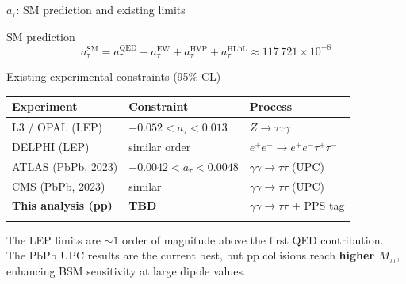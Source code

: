 \begin{frame}{\(a_\tau\): SM prediction and existing limits}
\protect{}\label{a_tau-sm-prediction-and-existing-limits}
\begin{block}{SM prediction}
\protect{}\label{sm-prediction}
\[a_\tau^\text{SM} = a_\tau^\text{QED} + a_\tau^\text{EW} + a_\tau^\text{HVP} + a_\tau^\text{HLbL} \approx 117\,721 \times 10^{-8}\]
\end{block}

\begin{block}{Existing experimental constraints (95\% CL)}
\protect{}\label{existing-experimental-constraints-95-cl}
{\def\LTcaptype{none} %
\begin{longtable}[]{@{}
  >{\raggedright\arraybackslash}p{}
  >{\raggedright\arraybackslash}p{}
  >{\raggedright\arraybackslash}p{}@{}}
\toprule\noalign{}
\begin{minipage}[b]{\linewidth}\raggedright
Experiment
\end{minipage} & \begin{minipage}[b]{\linewidth}\raggedright
Constraint
\end{minipage} & \begin{minipage}[b]{\linewidth}\raggedright
Process
\end{minipage} \\
\midrule\noalign{}
\endhead
L3 / OPAL (LEP) & \(-0.052 < a_\tau < 0.013\) &
\(Z \to \tau\tau\gamma\) \\
DELPHI (LEP) & similar order & \(e^+e^- \to e^+e^-\tau^+\tau^-\) \\
ATLAS (PbPb, 2023) & \(-0.0042 < a_\tau < 0.0048\) &
\(\gamma\gamma \to \tau\tau\) (UPC) \\
CMS (PbPb, 2023) & similar & \(\gamma\gamma \to \tau\tau\) (UPC) \\
\textbf{This analysis (pp)} & \textbf{TBD} &
\(\gamma\gamma \to \tau\tau\) + PPS tag \\
\bottomrule\noalign{}
\end{longtable}
}

The LEP limits are \(\sim 1\) order of magnitude above the first QED
contribution.\\
The PbPb UPC results are the current best, but pp collisions reach
\textbf{higher \(M_{\tau\tau}\)}, enhancing BSM sensitivity at large
dipole values.
\end{block}
\end{frame}

